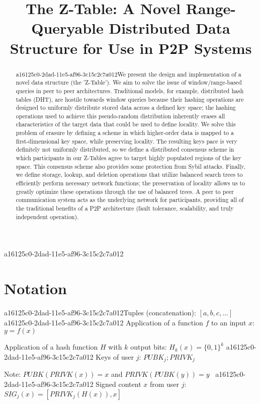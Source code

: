 \documentclass[12pt]{article}
\title{The Z-Table: A Novel Range-Queryable Distributed Data Structure for Use in P2P Systems}
\begin{document}
\maketitle

\begin{abstract}
a16125c0-2dad-11e5-af96-3c15c2c7a012We present the design and implementation of a novel data structure (the 'Z-Table'). We aim to solve the issue of window/range-based queries in peer to peer architectures. Traditional models, for example,  distributed hash tables (DHT), are hostile towards window queries because their hashing operations are designed to uniformly distribute stored data across a defined key space; the hashing operations used to achieve this pseudo-random distribution inherently erases all characteristics of the target data that could be used to define locality. We solve this problem of erasure by defining a scheme in which higher-order data is mapped to a first-dimensional key space, while preserving locality. The resulting keys pace is very definitely not uniformly distributed, so we define a distributed consensus scheme in which participants in our Z-Tables agree to target highly populated regions of the key space. This consensus scheme also provides some protection from Sybil attacks. Finally, we define storage, lookup, and deletion operations that utilize balanced search trees to efficiently perform necessary network functions; the preservation of locality allows us to greatly optimize these operations through the use of balanced trees. A peer to peer communication system acts as the underlying network for participants, providing all of the traditional benefits of a P2P architecture (fault tolerance, scalability, and truly independent operation).
\end{abstract}
a16125c0-2dad-11e5-af96-3c15c2c7a012
\section{Notation}

a16125c0-2dad-11e5-af96-3c15c2c7a012Tuples (concatenation): $[a,b,c,...]$
a16125c0-2dad-11e5-af96-3c15c2c7a012
Application of a function $f$ to an input $x$: $y=f(x)$

Application of a hash function $H$ with $k$ output bits: $H_{k}(x) = \{0,1\}^k$
a16125c0-2dad-11e5-af96-3c15c2c7a012
Keys of user $j$: $ PUBK_j; PRIVK_j $

Note: $PUBK(PRIVK(x)) = x$ and $PRIVK(PUBK(y)) = y$~
a16125c0-2dad-11e5-af96-3c15c2c7a012
Signed content $x$ from user $j$: $SIG_j(x) = \left[ PRIVK_j( H(x) ), x \right]$
\end{document}
